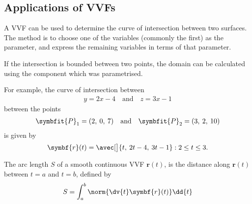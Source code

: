 \documentclass{article}
\begin{document}
\subsection{Applications of VVFs}
\begin{theorem}
    A VVF can be used to determine the curve of intersection between two 
    surfaces. The method is to choose one of the variables (commonly the first)
    as the parameter, and express the remaining variables in terms of that parameter. 

    If the intersection is bounded between two points, the domain can be
    calculated using the component which was parametrised.

    For example, the curve of intersection between 
    \begin{align*}
        y = 2x - 4 \quad \text{and} \quad z = 3x - 1
    \end{align*}
    between the points 
    \begin{align*}
        \symbfit{P}_1 = (2,\: 0,\: 7) \quad \text{and} \quad \symbfit{P}_2 = (3,\: 2,\: 10)
    \end{align*}
    is given by 
    \begin{equation*}
        \symbf{r}(t) = \avec[\big]{t,\: 2t - 4,\: 3t - 1} : 2 \leq t \leq 3.
    \end{equation*}
\end{theorem}
\begin{definition}
    The arc length $S$ of a smooth continuous VVF $\symbf{r}(t)$, is the distance along $\symbf{r}(t)$
    between $t=a$ and $t=b$, defined by
    \begin{equation*}
        S = \int_a^b \norm{\dv{t}\symbf{r}(t)} \dd{t}
    \end{equation*}
\end{definition}
\newpage
\end{document}
